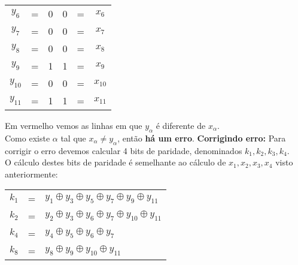 \documentclass[12pt]{article}
\begin{document}
\begin{itemize}
\begin{center}
\begin{tabular}{ccc|ccc}
							$y_6$ & = & 0 & 0 & = & $x_6$\\
							$y_7$ & = & 0 & 0 & = & $x_7$\\
							$y_8$ & = & 0 & 0 & = & $x_8$\\
							$y_9$ & = & 1 & 1 & = & $x_9$\\
							$y_{10}$ & = & 0 & 0 & = & $x_{10}$\\
							$y_{11}$ & = & 1 & 1 & = & $x_{11}$\\
						\end{tabular}
					\end{center}
					Em \color{red}vermelho \color{black} vemos as linhas em que $y_\alpha$ é diferente
					de $x_\alpha$.\\
					Como existe $\alpha$ tal que $x_\alpha \neq y_\alpha$, então \textbf{há um erro}.
					\hfill\newline
					\subitem \textbf{Corrigindo erro:}
					\hfill\newline
					Para corrigir o erro devemos calcular 4 bits de paridade, denominados $k_1, k_2, k_3, k_4$.\\
					O cálculo destes bits de paridade é semelhante ao cálculo de $x_1, x_2, x_3, x_4$ visto
					anteriormente:
					\begin{center}
						\begin{tabular}{ccl}
							$k_1$ & = & $y_1 \oplus y_3 \oplus y_5 \oplus y_7 \oplus y_9 \oplus y_{11}$\\
							$k_2$ & = & $y_2 \oplus y_3 \oplus y_6 \oplus y_7 \oplus y_{10} \oplus y_{11}$\\
							$k_4$ & = & $y_4 \oplus y_5 \oplus y_6 \oplus y_7$\\
							$k_8$ & = & $y_8 \oplus y_9 \oplus y_{10} \oplus y_{11}$\\
						\end{tabular}
					\end{center}
	\end{itemize}
\end{document}
